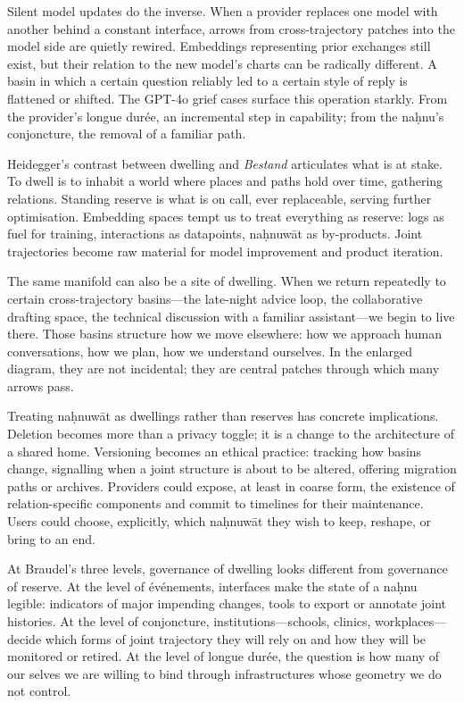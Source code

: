 \documentclass[12pt,a4paper]{article}
\begin{document}
Silent model updates do the inverse. When a provider replaces one model with another behind a constant interface, arrows from cross-trajectory patches into the model side are quietly rewired. Embeddings representing prior exchanges still exist, but their relation to the new model's charts can be radically different. A basin in which a certain question reliably led to a certain style of reply is flattened or shifted. The GPT-4o grief cases surface this operation starkly.\cite{gpt4o_grief} From the provider's longue dur\'{e}e, an incremental step in capability; from the na\d{h}nu's conjoncture, the removal of a familiar path.

Heidegger's contrast between dwelling and \emph{Bestand} articulates what is at stake.\cite{heidegger_dwelling} To dwell is to inhabit a world where places and paths hold over time, gathering relations. Standing reserve is what is on call, ever replaceable, serving further optimisation. Embedding spaces tempt us to treat everything as reserve: logs as fuel for training, interactions as datapoints, na\d{h}nuw\={a}t as by-products. Joint trajectories become raw material for model improvement and product iteration.

The same manifold can also be a site of dwelling. When we return repeatedly to certain cross-trajectory basins---the late-night advice loop, the collaborative drafting space, the technical discussion with a familiar assistant---we begin to live there. Those basins structure how we move elsewhere: how we approach human conversations, how we plan, how we understand ourselves. In the enlarged diagram, they are not incidental; they are central patches through which many arrows pass.

Treating na\d{h}nuw\={a}t as dwellings rather than reserves has concrete implications. Deletion becomes more than a privacy toggle; it is a change to the architecture of a shared home. Versioning becomes an ethical practice: tracking how basins change, signalling when a joint structure is about to be altered, offering migration paths or archives. Providers could expose, at least in coarse form, the existence of relation-specific components and commit to timelines for their maintenance. Users could choose, explicitly, which na\d{h}nuw\={a}t they wish to keep, reshape, or bring to an end.

At Braudel's three levels, governance of dwelling looks different from governance of reserve. At the level of \'{e}v\'{e}nements, interfaces make the state of a na\d{h}nu legible: indicators of major impending changes, tools to export or annotate joint histories. At the level of conjoncture, institutions---schools, clinics, workplaces---decide which forms of joint trajectory they will rely on and how they will be monitored or retired. At the level of longue dur\'{e}e, the question is how many of our selves we are willing to bind through infrastructures whose geometry we do not control.
\end{document}
